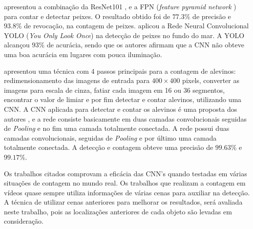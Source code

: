 \cite{ICESJournal} apresentou a combinação da ResNet101 \cite{ResNet50}, e a FPN (\textit{feature pyramid network} \cite{FPN}) para contar e detectar peixes. O resultado obtido foi de $77.3\%$ de precisão e $93.8\%$ de revocação, na contagem de peixes. \cite{YOLOFish} aplicou a Rede Neural Convolucional YOLO (\textit{You Only Look Once}) na detecção de peixes no fundo do mar.
A YOLO alcançou $93\%$ de acurácia, sendo que os autores afirmam que a CNN não obteve uma boa acurácia em lugares com pouca iluminação.

\cite{FingerLing} apresentou uma técnica com 4 passos principais para a contagem de alevinos: redimensionamento das imagens de entrada para $400\times400$ pixels, converter as imagens para escala de cinza, fatiar cada imagem em 16 ou 36 segmentos, encontrar o valor de limiar e por fim detectar e contar alevinos, utilizando uma CNN. A CNN aplicada para detectar e contar os alevinos é uma proposta dos autores \cite{FingerLing}, e a rede consiste basicamente em duas camadas convolucionais seguidas de \textit{Pooling} e no fim uma camada totalmente conectada.
A rede possui duas camadas convolucionais, seguidas de \textit{Pooling} e por último uma camada totalmente conectada.
A detecção e contagem obteve uma precisão de $99.63\%$ e $99.17\%$.



Os trabalhos citados comprovam a eficácia das CNN's quando testadas em várias situações de contagem no mundo real. Os trabalhos que realizam a contagem em vídeos quase sempre utiliza informações de várias cenas para auxiliar na detecção. A técnica de utilizar cenas anteriores para melhorar os resultados, será avaliada neste trabalho, pois as localizações anteriores de cada objeto são levadas em consideração.
